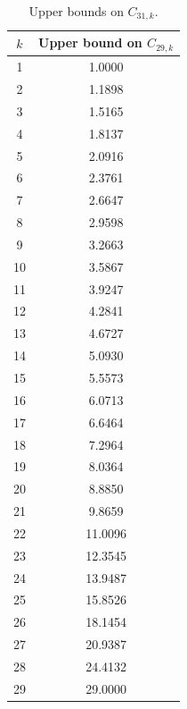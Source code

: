 \documentclass[11pt]{article}
\begin{document}
\begin{table}
    \begin{minipage}[t]{.5\linewidth}
        \centering
        \footnotesize
        \caption{Upper bounds on $C_{29,k}$.
        }
        \label{tab:C_29_k}
        \begin{tabular}{c|c}
        \hline
        $k$ & Upper bound on $C_{29,k}$ \\
        \hline
        1  & 1.0000 \\
        2  & 1.1898 \\
        3  & 1.5165 \\
        4  & 1.8137 \\
        5  & 2.0916 \\
        6  & 2.3761 \\
        7  & 2.6647 \\
        8  & 2.9598 \\
        9  & 3.2663 \\
        10 & 3.5867 \\
        11 & 3.9247 \\
        12 & 4.2841 \\
        13 & 4.6727 \\
        14 & 5.0930 \\
        15 & 5.5573 \\
        16 & 6.0713 \\
        17 & 6.6464 \\
        18 & 7.2964 \\
        19 & 8.0364 \\
        20 & 8.8850 \\
        21 & 9.8659 \\
        22 & 11.0096 \\
        23 & 12.3545 \\
        24 & 13.9487 \\
        25 & 15.8526 \\
        26 & 18.1454 \\
        27 & 20.9387 \\
        28 & 24.4132 \\
        29 & 29.0000 \\
        \hline
    \end{tabular}
\end{minipage}
    \begin{minipage}[t]{.5\linewidth}
        \centering
        \caption{
        Upper bounds on $C_{31,k}$.}
        \label{tab:C_31_k}
        \footnotesize

\end{minipage}
\end{table}
\end{document}
